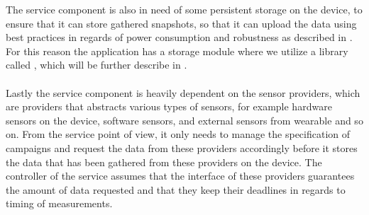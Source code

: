 The service component is also in need of some persistent storage on the device, to ensure that it can store gathered snapshots, so that it can upload the data using best practices in regards of power consumption and robustness as described in . For this reason the application has a storage module where we utilize a library called , which will be further describe in .
\\\\
Lastly the service component is heavily dependent on the sensor providers, which are providers that abstracts various types of sensors, for example hardware sensors on the device, software sensors, and external sensors from wearable and so on. From the service point of view, it only needs to manage the specification of campaigns and request the data from these providers accordingly before it stores the data that has been gathered from these providers on the device. The controller of the service assumes that the interface of these providers guarantees the amount of data requested and that they keep their deadlines in regards to timing of measurements.


